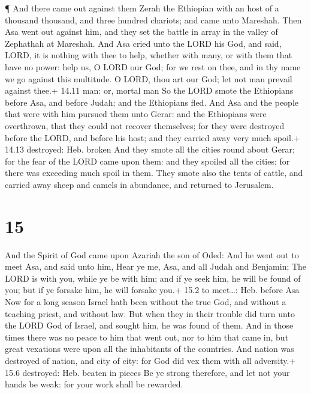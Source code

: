  ¶ And there came out against them Zerah the Ethiopian with
an host of a thousand thousand, and three hundred chariots; and came
unto Mareshah.  Then Asa went out against him, and they set
the battle in array in the valley of Zephathah at Mareshah.
 And Asa cried unto the LORD his God, and said, LORD, it is
nothing with thee to help, whether with many, or with them that have no
power: help us, O LORD our God; for we rest on thee, and in thy name we
go against this multitude. O LORD, thou art our God; let not man prevail
against thee.+ 14.11 man: or, mortal man  So the LORD smote
the Ethiopians before Asa, and before Judah; and the Ethiopians fled.
 And Asa and the people that were with him pursued them
unto Gerar: and the Ethiopians were overthrown, that they could not
recover themselves; for they were destroyed before the LORD, and before
his host; and they carried away very much spoil.+ 14.13 destroyed: Heb.
broken  And they smote all the cities round about Gerar;
for the fear of the LORD came upon them: and they spoiled all the
cities; for there was exceeding much spoil in them.  They
smote also the tents of cattle, and carried away sheep and camels in
abundance, and returned to Jerusalem.

\hypertarget{section-14}{%
\section{15}\label{section-14}}

 And the Spirit of God came upon Azariah the son of Oded:
 And he went out to meet Asa, and said unto him, Hear ye me,
Asa, and all Judah and Benjamin; The LORD is with you, while ye be with
him; and if ye seek him, he will be found of you; but if ye forsake him,
he will forsake you.+ 15.2 to meet\ldots: Heb. before Asa 
Now for a long season Israel hath been without the true God, and without
a teaching priest, and without law.  But when they in their
trouble did turn unto the LORD God of Israel, and sought him, he was
found of them.  And in those times there was no peace to him
that went out, nor to him that came in, but great vexations were upon
all the inhabitants of the countries.  And nation was
destroyed of nation, and city of city: for God did vex them with all
adversity.+ 15.6 destroyed: Heb. beaten in pieces  Be ye
strong therefore, and let not your hands be weak: for your work shall be
rewarded.

